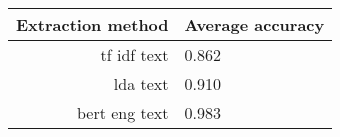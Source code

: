 \begin{tabular}{|r|l|}
  \hline
  Extraction method & Average accuracy \\ 
  \hline
  tf idf text & 0.862 \\ 
  \hline
  lda text & 0.910 \\ 
  \hline
  bert eng text & 0.983 \\ 
  \hline
\end{tabular}

